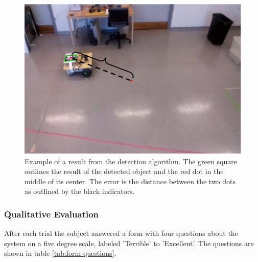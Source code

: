 \documentclass[nofilelist]{cslthse-msc}
\begin{document}
\begin{figure}[!hbt]
   \centering
   \includegraphics[scale=0.3]{images/resultcalc.png} 
   \caption{Example of a result from the detection algorithm. The green square outlines the result of the detected object and the red dot in the middle of its center. The error is the distance between the two dots as outlined by the black indicators.}
   \label{fig:resultcalc}
\end{figure}

\subsubsection{Qualitative Evaluation}
After each trial the subject answered a form with four questions about the system on a five degree scale, labeled 'Terrible' to 'Excellent'. The questions are shown in table \ref{tab:form-questions}. 

\setlength{\extrarowheight}{5pt}
\vspace{10pt}
\end{document}
